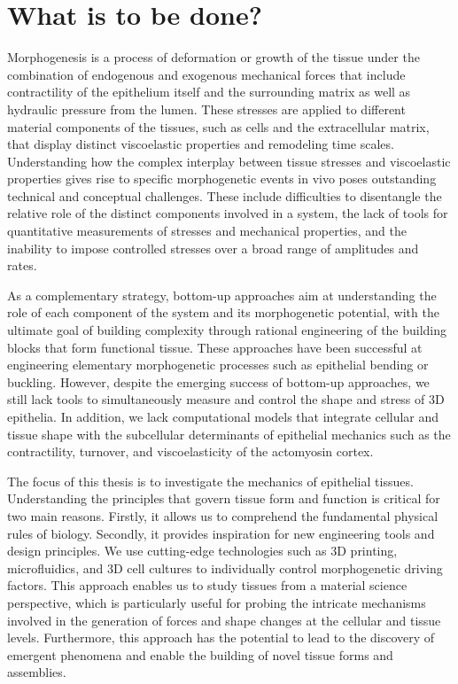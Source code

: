 \hypertarget{what-is-to-be-done}{%
\section{What is to be done?}\label{what-is-to-be-done}}

Morphogenesis is a process of deformation or growth of the tissue under the combination of endogenous and exogenous mechanical forces that include contractility of the epithelium itself and the surrounding matrix as well as hydraulic pressure from the lumen. These stresses are applied to different material components of the tissues, such as cells and the extracellular matrix, that display distinct viscoelastic properties and remodeling time scales. Understanding how the complex interplay between tissue stresses and viscoelastic properties gives rise to specific morphogenetic events in vivo poses outstanding technical and conceptual challenges. These include difficulties to disentangle the relative role of the distinct components involved in a system, the lack of tools for quantitative measurements of stresses and mechanical properties, and the inability to impose controlled stresses over a broad range of amplitudes and rates.~

As a complementary strategy, bottom-up approaches aim at understanding the role of each component of the system and its morphogenetic potential, with the ultimate goal of building complexity through rational engineering of the building blocks that form functional tissue. These approaches have been successful at engineering elementary morphogenetic processes such as epithelial bending or buckling. However, despite the emerging success of bottom-up approaches, we still lack tools to simultaneously measure and control the shape and stress of 3D epithelia. In addition, we lack computational models that integrate cellular and tissue shape with the subcellular determinants of epithelial mechanics such as the contractility, turnover, and viscoelasticity of the actomyosin cortex.

The focus of this thesis is to investigate the mechanics of epithelial tissues. Understanding the principles that govern tissue form and function is critical for two main reasons. Firstly, it allows us to comprehend the fundamental physical rules of biology. Secondly, it provides inspiration for new engineering tools and design principles. We use cutting-edge technologies such as 3D printing, microfluidics, and 3D
cell cultures to individually control morphogenetic driving factors. This approach enables us to study tissues from a material science perspective, which is particularly useful for probing the intricate mechanisms involved in the generation of forces and shape changes at the cellular and tissue levels. Furthermore, this approach has the potential to lead to the discovery of emergent phenomena and enable the building of novel tissue forms and assemblies.

